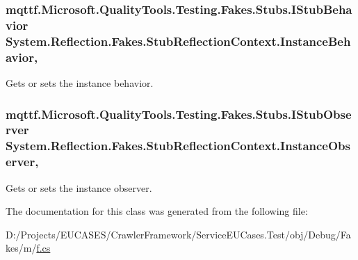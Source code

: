 \hypertarget{class_system_1_1_reflection_1_1_fakes_1_1_stub_reflection_context_a2c66c45b9d5a4108392e592ace8a6ac9}{
\subsubsection[{Instance\-Behavior}]{\setlength{\rightskip}{0pt plus 5cm}mqttf.\-Microsoft.\-Quality\-Tools.\-Testing.\-Fakes.\-Stubs.\-I\-Stub\-Behavior System.\-Reflection.\-Fakes.\-Stub\-Reflection\-Context.\-Instance\-Behavior\hspace{0.3cm}{\ttfamily [get]}, {\ttfamily [set]}}}\label{class_system_1_1_reflection_1_1_fakes_1_1_stub_reflection_context_a2c66c45b9d5a4108392e592ace8a6ac9}


Gets or sets the instance behavior.

\hypertarget{class_system_1_1_reflection_1_1_fakes_1_1_stub_reflection_context_a3f13e50c3a79c1195dd24fd11c7548bd}{
\subsubsection[{Instance\-Observer}]{\setlength{\rightskip}{0pt plus 5cm}mqttf.\-Microsoft.\-Quality\-Tools.\-Testing.\-Fakes.\-Stubs.\-I\-Stub\-Observer System.\-Reflection.\-Fakes.\-Stub\-Reflection\-Context.\-Instance\-Observer\hspace{0.3cm}{\ttfamily [get]}, {\ttfamily [set]}}}\label{class_system_1_1_reflection_1_1_fakes_1_1_stub_reflection_context_a3f13e50c3a79c1195dd24fd11c7548bd}


Gets or sets the instance observer.



The documentation for this class was generated from the following file\-:\begin{DoxyCompactItemize}
\item 
D\-:/\-Projects/\-E\-U\-C\-A\-S\-E\-S/\-Crawler\-Framework/\-Service\-E\-U\-Cases.\-Test/obj/\-Debug/\-Fakes/m/\hyperlink{m_2f_8cs}{f.\-cs}\end{DoxyCompactItemize}
